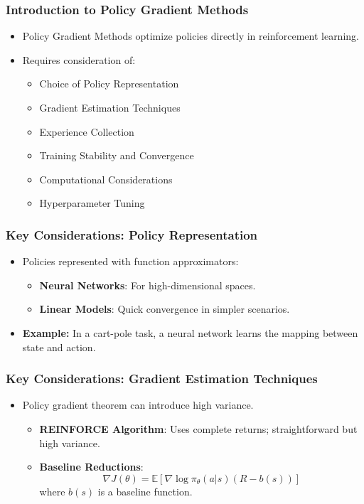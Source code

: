\documentclass[aspectratio=169]{beamer}
\begin{document}
\begin{frame}
    \frametitle{Introduction to Policy Gradient Methods}
    \begin{itemize}
        \item Policy Gradient Methods optimize policies directly in reinforcement learning.
        \item Requires consideration of:
        \begin{itemize}
            \item Choice of Policy Representation
            \item Gradient Estimation Techniques
            \item Experience Collection
            \item Training Stability and Convergence
            \item Computational Considerations
            \item Hyperparameter Tuning
        \end{itemize}
    \end{itemize}
\end{frame}

\begin{frame}
    \frametitle{Key Considerations: Policy Representation}
    \begin{itemize}
        \item Policies represented with function approximators:
        \begin{itemize}
            \item \textbf{Neural Networks}: For high-dimensional spaces. 
            \item \textbf{Linear Models}: Quick convergence in simpler scenarios.
        \end{itemize}
        \item \textbf{Example:} In a cart-pole task, a neural network learns the mapping between state and action.
    \end{itemize}
\end{frame}

\begin{frame}
    \frametitle{Key Considerations: Gradient Estimation Techniques}
    \begin{itemize}
        \item Policy gradient theorem can introduce high variance.
        \begin{itemize}
            \item \textbf{REINFORCE Algorithm}: Uses complete returns; straightforward but high variance.
            \item \textbf{Baseline Reductions}:
            \begin{equation}
            \nabla J(\theta) = \mathbb{E} \left[ \nabla \log \pi_\theta(a|s) \left( R - b(s) \right) \right]
            \end{equation}
            where \( b(s) \) is a baseline function.
        \end{itemize}
    \end{itemize}
\end{frame}
\end{document}
